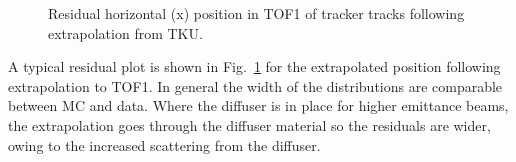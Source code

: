 %
%
%

\begin{figure}[!tbh]
    \centering
    {Residual horizontal (x) position in TOF1 of tracker tracks following extrapolation from TKU. \label{fig:tof1_extrapolated_x}}
\end{figure}

%

A typical residual plot is shown in Fig.~\ref{fig:tof1_extrapolated_x} for the extrapolated position following extrapolation to TOF1.
In general the width of the distributions are comparable between MC and data. Where the diffuser is in place for higher emittance beams, the extrapolation goes through the diffuser material so the residuals are wider, owing to the increased scattering from the diffuser.



